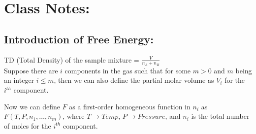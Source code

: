 \documentclass{article}
\theoremstyle{definition}
\begin{document}
\section{Class Notes:}
\subsection{Introduction of Free Energy:}
TD (Total Density) of the sample mixture = $\frac{V}{n_A + n_B}$\\

Suppose there are $i$ components in the gas such that for some $m>0 $ and $m$ being an integer $i \leq m$, then we can also define the partial molar volume as $V_i$ for the $i^{th}$ component. 

Now we can define $F$ as a first-order homogeneous function in $n_i$ as $F(T,P, n_1, \ldots, n_m)$, where $T\rightarrow Temp$, $P\rightarrow Pressure$, and $n_i$ is the total number of moles for the $i^{th}$ component.
\end{document}

